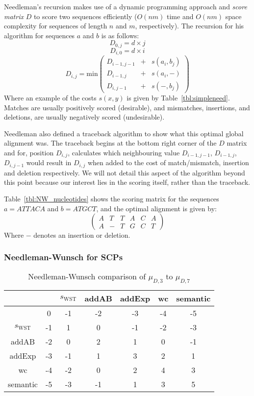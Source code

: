 Needleman's recursion makes use of a dynamic programming approach and \textit{score matrix} $D$ to score two sequences efficiently ($O(nm)$ time and $O(nm)$ space complexity for sequences of length $n$ and $m$, respectively). The recursion for his algorithm for sequences $a$ and $b$ is as follows:
\[
D_{0,j}=d \times j
\]
\[
D_{i,0}=d \times i
\]
\[
D_{i,j}=\text{min}
\begin{pmatrix}
D_{i-1,j-1} & + & s(a_i,b_j)\\
D_{i-1,j} & + & s(a_i, - )\\
D_{i,j-1} & + & s(-,b_j)
\end{pmatrix}
\]
Where an example of the costs $s(x,y)$ is given by Table~\ref{tbl:simpleneed}. Matches are usually positively scored (desirable), and mismatches, insertions, and deletions, are usually negatively scored (undesirable).

Needleman also defined a traceback algorithm to show what this optimal global alignment was. The traceback begins at the bottom right corner of the $D$ matrix and for, position $D_{i,j}$, calculates which neighbouring value $D_{i-1,j-1}$, $D_{i-1,j}$, $D_{i,j-1}$ would result in $D_{i,j}$ when added to the cost of match/mismatch, insertion and deletion respectively. We will not detail this aspect of the algorithm beyond this point because our interest lies in the scoring itself, rather than the traceback.

Table~\ref{tbl:NW_nucleotides} shows the scoring matrix for the sequences $a=ATTACA$ and $b=ATGCT$, and the optimal alignment is given by:
\[
\begin{pmatrix}
A & T & T & A & C & A \\
A & - & T & G & C & T
\end{pmatrix}
\]
Where $-$ denotes an insertion or deletion.

\subsubsection{Needleman-Wunsch for SCPs}

\begin{table}
\begin{center}
\begin{tabular}{c | c c c c c c }
 & & $s_\text{WST}$ & addAB & addExp & wc & semantic\\
 \hline
 & 0 & -1 & -2 & -3 & -4 & -5\\
$s_\text{WST}$ & -1 & 1 & 0 & -1 & -2 & -3\\
addAB & -2 & 0 & 2 & 1 & 0 & -1\\
addExp & -3 & -1 & 1 & 3 & 2 & 1\\
wc & -4 & -2 & 0 & 2 & 4 & 3\\
semantic & -5 & -3 & -1 & 1 & 3 & 5
\end{tabular}
\caption{Needleman-Wunsch comparison of $\mu_{D,3}$ to $\mu_{D,7}$}
\label{tbl:compD3D7}
\end{center}
\end{table}

